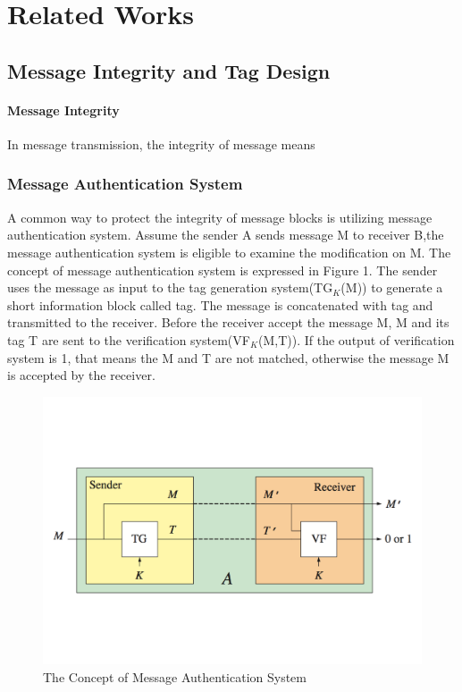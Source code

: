 \documentclass{article}
\begin{document}
\section{Related Works}
\subsection{Message Integrity and Tag Design}
\paragraph{Message Integrity}
In message transmission, the integrity of message means 
\subsubsection{Message Authentication System}
A common way to protect the integrity of message blocks is utilizing message authentication system. Assume the sender A sends message M to receiver B,the message authentication system is eligible to examine the modification on M. The concept of message authentication system is expressed in Figure 1. The sender uses the message as input to the tag generation system(TG$_K$(M)) to generate a short information block called tag. The message is concatenated with tag and transmitted to the receiver. Before the receiver accept the message M, M and its tag T are sent to the verification system(VF$_K$(M,T)). If the output of verification system is 1, that means the M and T are not matched, otherwise the message M is accepted by the receiver. 
\begin{figure}[htbp]
\centering
\includegraphics[scale=0.4]{./diagrams/ma.pdf}
\caption{The Concept of Message Authentication System}
\label{fig:1 }
\end{figure}
\end{document}
